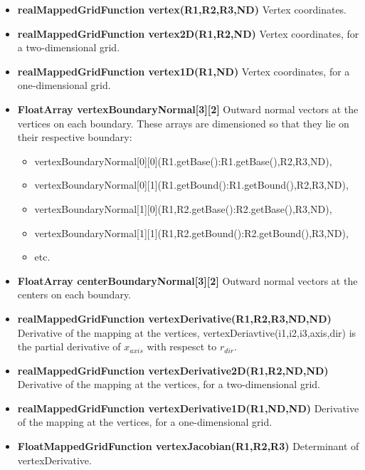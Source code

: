 \begin{itemize}
\item {\bf realMappedGridFunction vertex(R1,R2,R3,ND)}
          Vertex coordinates.                                          
\item {\bf realMappedGridFunction vertex2D(R1,R2,ND)}
           Vertex coordinates, for a two-dimensional grid.
\item {\bf realMappedGridFunction vertex1D(R1,ND)}
           Vertex coordinates, for a one-dimensional grid.
\item{\bf FloatArray vertexBoundaryNormal[3][2]}
  Outward normal vectors at the vertices on each boundary. These arrays are dimensioned so
  that they lie on their respective boundary:
  \begin{itemize}
    \item vertexBoundaryNormal[0][0](R1.getBase():R1.getBase(),R2,R3,ND),
    \item vertexBoundaryNormal[0][1](R1.getBound():R1.getBound(),R2,R3,ND),
    \item vertexBoundaryNormal[1][0](R1,R2.getBase():R2.getBase(),R3,ND),
    \item vertexBoundaryNormal[1][1](R1,R2.getBound():R2.getBound(),R3,ND), 
    \item etc.
  \end{itemize}
\item{\bf FloatArray centerBoundaryNormal[3][2]}
  Outward normal vectors at the centers on each boundary.
\item {\bf realMappedGridFunction vertexDerivative(R1,R2,R3,ND,ND)}
         Derivative of the mapping at the vertices, {\ff vertexDeriavtive(i1,i2,i3,axis,dir)}
        is the partial derivative of $x_{axis}$ with respesct to $r_{dir}$.
\item {\bf realMappedGridFunction vertexDerivative2D(R1,R2,ND,ND)}
         Derivative of the mapping at the vertices, for a two-dimensional grid.
\item {\bf realMappedGridFunction vertexDerivative1D(R1,ND,ND)}
         Derivative of the mapping at the vertices, for a one-dimensional grid.
\item{\bf FloatMappedGridFunction vertexJacobian(R1,R2,R3)} Determinant of vertexDerivative.


\end{itemize}

